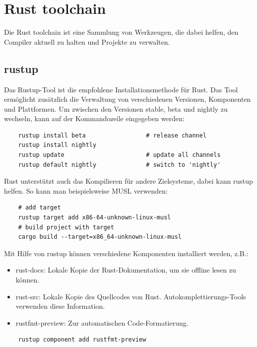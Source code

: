 \chapter{Rust toolchain}

Die Rust toolchain ist eine Sammlung von Werkzeugen, die dabei helfen, den Compiler aktuell zu halten und Projekte zu verwalten.


\section{rustup}

Das Rustup-Tool ist die empfohlene Installationsmethode für Rust. Das Tool ermöglicht zusätzlich die Verwaltung von verschiedenen Versionen, Komponenten und Plattformen. Um zwischen den Versionen stable, beta und nightly zu wechseln, kann auf der Kommandozeile eingegeben werden: \cite{RustEdition}

\begin{lstlisting}   
    rustup install beta                 # release channel
    rustup install nightly
    rustup update                       # update all channels
    rustup default nightly              # switch to 'nightly'
\end{lstlisting}

Rust unterstützt auch das Kompilieren für andere Zielsysteme, dabei kann rustup helfen. So kann man beispielsweise MUSL verwenden:

\begin{lstlisting}
    # add target
    rustup target add x86-64-unknown-linux-musl
    # build project with target
    cargo build --target=x86_64-unknown-linux-musl
\end{lstlisting}

Mit Hilfe von rustup können verschiedene Komponenten installiert werden, z.B.:

\begin{itemize}
    \item rust-docs: Lokale Kopie der Rust-Dokumentation, um sie offline lesen zu können.
    \item rust-src: Lokale Kopie des Quellcodes von Rust. Autokomplettierungs-Tools verwenden diese Information.
    \item rustfmt-preview: Zur automatischen Code-Formatierung.
\end{itemize}

\begin{lstlisting}
    rustup component add rustfmt-preview
\end{lstlisting}



